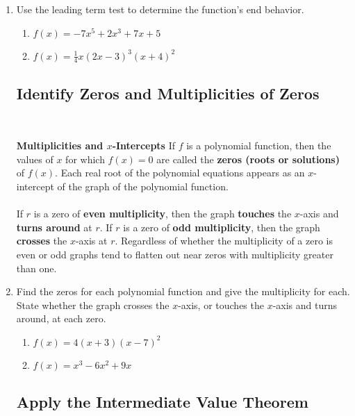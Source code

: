 \begin{enumerate}

\item Use the leading term test to determine the function's end behavior.


\begin{enumerate}
\item $f(x)=-7x^5+2x^3+7x+5$
\vfill

\item $f(x)=\frac{1}{4}x(2x-3)^3(x+4)^2$
\vfill

\end{enumerate}

\subsection{Identify Zeros and Multiplicities of Zeros} ~

\begin{boxthm}
{\bf Multiplicities and $x$-Intercepts}
If $f$ is a polynomial function, then the values of $x$ for which $f(x)=0$ are called the \textbf{zeros (roots or solutions)} of $f(x)$.  Each real root of the polynomial equations appears as an $x$-intercept of the graph of the polynomial function.\\
\\
If $r$ is a zero of \textbf{even multiplicity}, then the graph \textbf{touches} the $x$-axis and \textbf{turns around} at $r$.  If $r$ is a zero of \textbf{odd multiplicity}, then the graph \textbf{crosses} the $x$-axis at $r$.  Regardless of whether the multiplicity of a zero is even or odd graphs tend to flatten out near zeros with multiplicity greater than one.
\end{boxthm}




\item Find the zeros for each polynomial function and give the multiplicity for each.  State whether the graph crosses the $x$-axis, or touches the $x$-axis and turns around, at each zero.

\begin{enumerate}
\item $f(x)=4(x+3)(x-7)^2$
\vfill
\item $f(x)=x^3-6x^2+9x$
\vfill
\end{enumerate}


\newpage

\subsection{Apply the Intermediate Value Theorem} ~


\end{enumerate}
